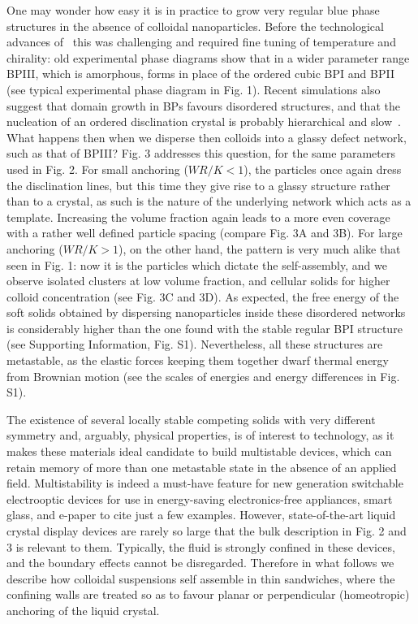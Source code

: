 \documentclass[12pt]{article}
\begin{document}
One may wonder how easy it is in practice to grow very regular blue
phase structures in the absence of colloidal nanoparticles. 
Before the technological advances of~\cite{kikuchi,coleswidetrange}
this was challenging and required fine tuning of temperature
and chirality: old experimental phase diagrams 
show that in a wider parameter range BPIII, which is amorphous, forms
in place of the ordered cubic BPI and BPII~\cite{mermin} (see 
typical experimental phase diagram in Fig. 1). 
Recent simulations also suggest that
domain growth in BPs favours disordered structures, and that the
nucleation of an ordered disclination crystal is probably hierarchical
and slow~\cite{domaingrowth,bp3}. 
What happens then when we disperse then colloids into a glassy
defect network, such as that of BPIII? Fig. 3 addresses this question,
for the same parameters used in Fig. 2. For small anchoring ($WR/K<1$),
the particles once again dress the disclination lines, but this time they
give rise to a glassy structure rather than to a crystal, as such
is the nature of the underlying network which acts as a template.
Increasing the volume fraction again leads to a more even coverage with
a rather well defined particle spacing (compare Fig. 3A and 3B). 
For large anchoring ($WR/K>1$), on the other hand, the pattern is very
much alike that seen in Fig. 1: now it is the particles which dictate
the self-assembly, and we observe isolated clusters at low volume 
fraction, and cellular solids for higher colloid concentration
(see Fig. 3C and 3D). As expected, the free energy of the soft solids
obtained by dispersing nanoparticles inside these disordered networks
is considerably higher than the one found with the stable regular BPI
structure (see Supporting Information, Fig. S1). 
Nevertheless, all these structures
are metastable, as the elastic forces keeping them together dwarf thermal
energy from Brownian motion (see the scales of energies and energy
differences in Fig. S1).


The existence of several locally stable competing solids with 
very different symmetry and, arguably, physical properties, 
is of interest to technology, as it makes these materials ideal
candidate to build multistable devices, which can retain memory of
more than one metastable state in the absence of an applied field.
Multistability is indeed a must-have feature for new generation switchable 
electrooptic devices for use in energy-saving electronics-free
appliances, smart glass, and e-paper to cite just a few examples.
However, state-of-the-art liquid crystal display devices are
rarely so large that the bulk description in Fig. 2 and 3 is relevant to
them. Typically, the fluid is strongly confined in these devices, and the
boundary effects cannot be disregarded. Therefore in what follows we describe
how colloidal suspensions self assemble in thin sandwiches, where
the confining walls are treated so as to favour planar or 
perpendicular (homeotropic) anchoring of the liquid crystal.
\end{document}
